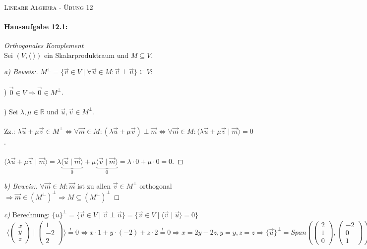 \documentclass[titlepage]{article}
\newcommand{\R}{\mathbb{R}}
\newcommand{\1}{\mathbb{1}}
\newcommand{\0}{\mathbb{0}}
\newcommand{\la}{\langle}
\newcommand{\ra}{\rangle}
\newcommand{\vecD}[3]{\left(\begin{smallmatrix}#1\\#2\\#3\end{smallmatrix}\right)}
\begin{document}
	
	\begin{center}
		\hrulefill\\
		\begin{center}
			\LARGE\textsc{Lineare Algebra - Übung 12} \normalsize\\
		\end{center}
		\hrulefill
		\date{\today}
	\end{center}

	\paragraph{Hausaufgabe 12.1:} \textit{Orthogonales Komplement} \\ Sei $(V,\la\mid\ra)$ ein Skalarproduktraum und $M\subseteq V.$ \\
	\begin{proof}[a) Beweis:]
		$M^{\perp}=\{\vec{v}\in V\mid\forall\vec{u}\in M:\vec{v}\perp\vec{u}\}\subseteq V$: \\\\ ) $\vec{0}\in V\Rightarrow\vec{0}\in M^{\perp}$. \\\\ ) Sei $\lambda,\mu\in\R$ und $\vec{u},\vec{v}\in M^{\perp}$. \\\\ \indent\quad\quad Zz.: $\lambda\vec{u}+\mu\vec{v}\in M^{\perp}\Leftrightarrow\forall\vec{m}\in M:(\lambda\vec{u}+\mu\vec{v})\perp\vec{m}\Leftrightarrow\forall\vec{m}\in M:\la\lambda\vec{u}+\mu\vec{v}\mid\vec{m}\ra=0$. \\\\ \indent\quad\quad $\la\lambda\vec{u}+\mu\vec{v}\mid\vec{m}\ra=\lambda\underbrace{\la\vec{u}\mid\vec{m}\ra}_0+\mu\underbrace{\la\vec{v}\mid\vec{m}\ra}_0=\lambda\cdot0+\mu\cdot0=0.$
	\end{proof}
	\noindent
	\begin{proof}[b) Beweis:]
		$\forall\vec{m}\in M:\vec{m}$ ist zu allen $\vec{v}\in M^\perp$ orthogonal $\Rightarrow\vec{m}\in(M^\perp)^\perp\Rightarrow M\subseteq(M^\perp)^\perp$
	\end{proof}
	\noindent
	\textit{c)} Berechnung: $\{u\}^\perp=\{\vec{v}\in V\mid \vec{v}\perp\vec{u}\}=\{\vec{v}\in V\mid\la\vec{v}\mid\vec{u}\ra=0\}$
	\begin{align*}
		\la\vecD{x}{y}{z}\mid\vecD{1}{-2}{2}\ra\overset{!}{=}0\Leftrightarrow x\cdot1+y\cdot(-2)+z\cdot2\overset{!}{=}0\Rightarrow x=2y-2z,y=y,z=z\Rightarrow \{\vec{u}\}^\perp=Span(\vecD{2}{1}{0},\vecD{-2}{0}{1})
	\end{align*}
\end{document}

